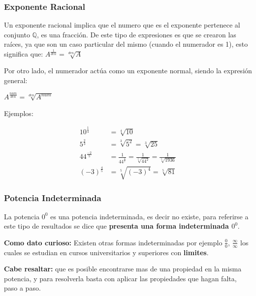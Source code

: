 \documentclass[12pt]{article}
\begin{document}
    \subsubsection*{Exponente Racional}

    Un exponente racional implica que el numero que es el exponente pertenece
    al conjunto $\mathbb{Q}$, es una fracción.
    De este tipo de expresiones es que se crearon las raíces, ya que son un
    caso particular del mismo (cuando el numerador es 1), esto significa que:
    $A^\frac{1}{den} = \sqrt[den]{A}$


    Por otro lado, el numerador actúa como un exponente normal, siendo la
    expresión general:

    $A^{\frac{num}{den} } = \sqrt[den]{A^{num}}$

    Ejemplos:

    \begin{align*}
        10^{\frac{1}{4}} &= \sqrt[4]{10} 		\\
        5^{\frac{2}{3} } &= \sqrt[3]{5^2} = \sqrt[3]{25} \\
        44^{\frac{-2}{5} }&= \frac{1}{44^{\frac{2}{5}}} = \frac{1}{ \sqrt[5]{44^2} }= \frac{1}{ \sqrt[5]{1936} } \\
        (-3)^{\frac{4}{5}} &= \sqrt[5]{(-3)^4} = \sqrt[5]{81}
    \end{align*}



    \subsubsection*{Potencia Indeterminada}
        La potencia $0^0$ es una potencia indeterminada, es decir no existe,
        para referirse a este tipo de resultados se dice que \textbf{presenta una
        forma indeterminada $0^0$}.

        \textbf{Como dato curioso: }
        Existen otras formas indeterminadas por ejemplo $\frac{0}{0}$,
        $\frac{\infty}{\infty}$ los cuales se estudian en cursos universitarios y
        superiores con \textbf{limites}.

\vspace*{1cm}

    \textbf{Cabe resaltar:} que es posible encontrarse mas de una propiedad en
    la misma potencia, y para resolverla basta con aplicar las propiedades que hagan
    falta, paso a paso.
\end{document}
